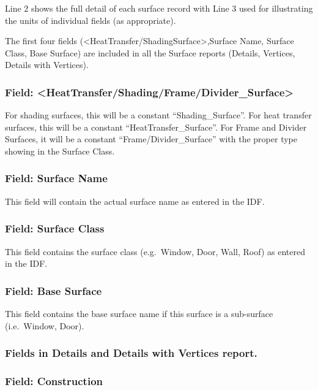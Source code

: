 Line 2 shows the full detail of each surface record with Line 3 used for illustrating the units of individual fields (as appropriate).

The first four fields (\textless{}HeatTransfer/ShadingSurface\textgreater{},Surface Name, Surface Class, Base Surface) are included in all the Surface reports (Details, Vertices, Details with Vertices).

\subsubsection{Field: \textless{}HeatTransfer/Shading/Frame/Divider\_Surface\textgreater{}}\label{field-heattransfershadingframedividerux5fsurface}

For shading surfaces, this will be a constant ``Shading\_Surface''. For heat transfer surfaces, this will be a constant ``HeatTransfer\_Surface''. For Frame and Divider Surfaces, it will be a constant ``Frame/Divider\_Surface'' with the proper type showing in the Surface Class.

\subsubsection{Field: Surface Name}\label{field-surface-name}

This field will contain the actual surface name as entered in the IDF.

\subsubsection{Field: Surface Class}\label{field-surface-class}

This field contains the surface class (e.g.~Window, Door, Wall, Roof) as entered in the IDF.

\subsubsection{Field: Base Surface}\label{field-base-surface}

This field contains the base surface name if this surface is a sub-surface (i.e.~Window, Door).

\subsubsection{Fields in Details and Details with Vertices report.}\label{fields-in-details-and-details-with-vertices-report.}

\subsubsection{Field: Construction}\label{field-construction}

